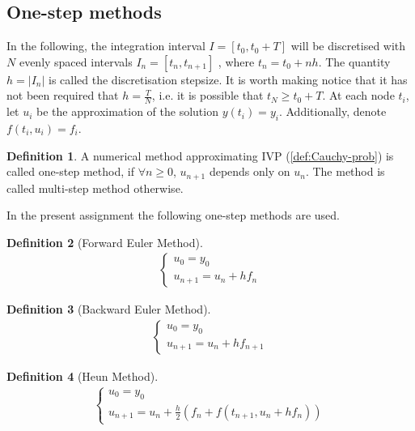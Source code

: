 \documentclass[11pt]{article}
\theoremstyle{theorem}
\theoremstyle{definition}
\newtheorem{definition}{Definition}
\begin{document}
\subsection{One-step methods}
In the following, the integration interval $I=[t_0, t_0+T]$ will be discretised with $N$ evenly spaced intervals $I_n=[t_n, t_{n+1}]$ , where $t_n=t_0+nh$. The quantity $h=|I_n|$ is called the discretisation stepsize. It is worth making notice that it has not been required that $h=\frac{T}{N}$, i.e. it is possible that $t_N\ge t_0 + T$.
At each node $t_i$, let $u_i$ be the approximation of the solution $y(t_i)=y_i$. Additionally, denote $f(t_i,u_i)=f_i$.\\

\begin{definition}
	\label{def:One-step-method}
	A numerical method approximating IVP (\ref{def:Cauchy-prob}) is called one-step method, if $\forall n\ge 0$, $u_{n+1}$ depends only on $u_n$. The method is called multi-step method otherwise.
\end{definition}

In the present assignment the following one-step methods are used.\\

\begin{definition}[Forward Euler Method]
	\label{def:FE}
	\begin{align}
	\begin{cases}
	\label{eqn:FE}
	u_0=y_0\\
	u_{n+1}=u_n+hf_n
	\end{cases}
	\end{align}
\end{definition}

\begin{definition}[Backward Euler Method]
	\label{def:BE}
	\begin{align}
	\begin{cases}
	\label{eqn:BE}
	u_0=y_0\\
	u_{n+1}=u_n+hf_{n+1}
	\end{cases}
	\end{align}
\end{definition}

\begin{definition}[Heun Method]
	\label{def:Heun}
	\begin{align}
	\begin{cases}
	\label{eqn:Heun}
	u_0=y_0\\
	u_{n+1}=u_n+\frac{h}{2}(f_n+f(t_{n+1}, u_n+hf_n))
	\end{cases}
	\end{align}
\end{definition}
\end{document}
